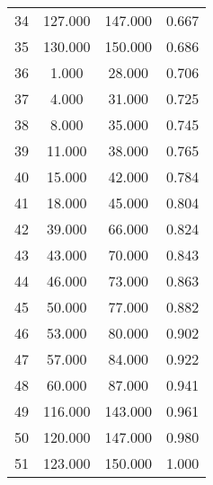 \begin{tabular}{cccc}
  34 & 127.000 & 147.000 & 0.667 \\ 
  35 & 130.000 & 150.000 & 0.686 \\ 
  36 & 1.000 & 28.000 & 0.706 \\ 
  37 & 4.000 & 31.000 & 0.725 \\ 
  38 & 8.000 & 35.000 & 0.745 \\ 
  39 & 11.000 & 38.000 & 0.765 \\ 
  40 & 15.000 & 42.000 & 0.784 \\ 
  41 & 18.000 & 45.000 & 0.804 \\ 
  42 & 39.000 & 66.000 & 0.824 \\ 
  43 & 43.000 & 70.000 & 0.843 \\ 
  44 & 46.000 & 73.000 & 0.863 \\ 
  45 & 50.000 & 77.000 & 0.882 \\ 
  46 & 53.000 & 80.000 & 0.902 \\ 
  47 & 57.000 & 84.000 & 0.922 \\ 
  48 & 60.000 & 87.000 & 0.941 \\ 
  49 & 116.000 & 143.000 & 0.961 \\ 
  50 & 120.000 & 147.000 & 0.980 \\ 
  51 & 123.000 & 150.000 & 1.000 \\ 
   \hline
\end{tabular}
